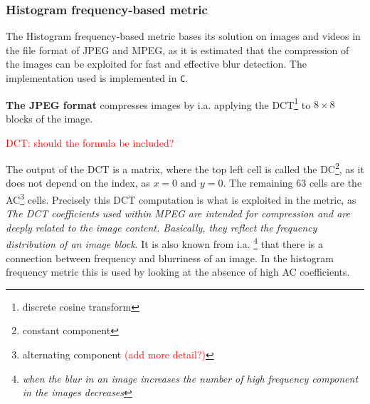 \subsubsection{Histogram frequency-based metric}
The Histogram frequency-based metric\cite{jnbm12} bases its solution on images and videos in the file format of JPEG and MPEG, as it is estimated that the compression of the images can be exploited for fast and effective blur detection. The implementation used\cite{code_HF} is implemented in \texttt{C}.



\textbf{The JPEG format} compresses images\cite{jpg} by i.a. applying the DCT\footnote{discrete cosine transform} to $8\times 8$ blocks of the image.

\textcolor{red}{DCT: should the formula be included?}

The output of the DCT is a matrix, where the top left cell is called the DC\footnote{constant component}, as it does not depend on the index, as $x=0 \text{ and } y=0$. The remaining 63 cells are the AC\footnote{alternating component \textcolor{red}{(add more detail?)}} cells.
Precisely this DCT computation is what is exploited in the metric, as \textit{The DCT coefficients used within MPEG are intended for compression and are deeply related to the image content. Basically, they reflect the frequency distribution of an image block}\cite{jnbm12}. It is also known from i.a. \cite{FM}\footnote{\textit{when the blur in an image increases the number of high frequency component in the images decreases}} that there is a connection between frequency and blurriness of an image. In the histogram frequency metric this is used by looking at the absence of high AC coefficients.

